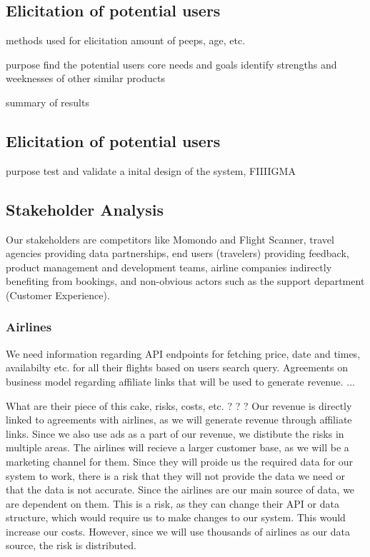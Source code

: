 \subsection{Elicitation of potential users}
methods used for elicitation
amount of peeps, age, etc.

purpose find the potential users core needs and goals
identify strengths and weeknesses of other similar products


summary of results


\subsection{Elicitation of potential users}
purpose test and validate a inital design of the system, FIIIIGMA


\subsection{Stakeholder Analysis}   
Our stakeholders are competitors like Momondo and Flight Scanner, travel agencies providing data partnerships, end users (travelers) providing feedback, product management and development teams, airline companies indirectly benefiting from bookings, and non-obvious actors such as the support department (Customer Experience). 

\subsubsection{Airlines}
We need information regarding API endpoints for fetching price, date and times, availabilty etc. for all their flights based on users search query. Agreements on business model regarding affiliate links that will be used to generate revenue.
...

What are their piece of this cake, risks, costs, etc. ? ? ? 
Our revenue is directly linked to agreements with airlines, as we will generate revenue through affiliate links. Since we also use ads as a part of our revenue, we distibute the risks in multiple areas.
The airlines will recieve a larger customer base, as we will be a marketing channel for them. Since they will proide us the required data for our system to work, there is a risk that they will not provide the data we need or that the data is not accurate. Since the airlines are our main source of data, we are dependent on them. This is a risk, as they can change their API or data structure, which would require us to make changes to our system. This would increase our costs. However, since we will use thousands of airlines as our data source, the risk is distributed.

